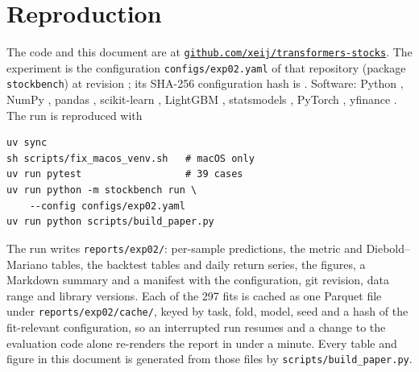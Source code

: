 \documentclass[10pt,a4paper,twoside,twocolumn]{article}
\begin{document}
\section{Reproduction}\label{app:repro}

The code and this document are at \href{https://github.com/xeij/transformers-stocks}{\texttt{github.com/xeij/transformers-stocks}}. The experiment is the configuration \texttt{configs/exp02.yaml} of that repository (package \texttt{stockbench}) at revision \texttt{\metasha}; its SHA-256 configuration hash is \texttt{\metaconfighash}. Software: Python \metavpython, NumPy \metavnumpy, pandas \metavpandas, scikit-learn \metavscikitlearn, LightGBM \metavlightgbm, statsmodels \metavstatsmodels, PyTorch \metavtorch, yfinance \metavyfinance. The run is reproduced with
{\footnotesize
\begin{verbatim}
uv sync
sh scripts/fix_macos_venv.sh   # macOS only
uv run pytest                  # 39 cases
uv run python -m stockbench run \
    --config configs/exp02.yaml
uv run python scripts/build_paper.py
\end{verbatim}}
The run writes \texttt{reports/exp02/}: per-sample predictions, the metric and Diebold--Mariano tables, the backtest tables and daily return series, the figures, a Markdown summary and a manifest with the configuration, git revision, data range and library versions. Each of the 297 fits is cached as one Parquet file under \texttt{reports/exp02/cache/}, keyed by task, fold, model, seed and a hash of the fit-relevant configuration, so an interrupted run resumes and a change to the evaluation code alone re-renders the report in under a minute. Every table and figure in this document is generated from those files by \texttt{scripts/build\_paper.py}.
\end{document}
